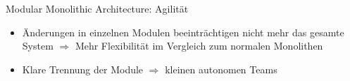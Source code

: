 \begin{frame}{Modular Monolithic Architecture: Agilität}
    \begin{itemize}
      \item Änderungen in einzelnen Modulen beeinträchtigen nicht mehr das gesamte System $\Rightarrow$ Mehr Flexibilität im Vergleich zum normalen Monolithen
        \item Klare Trennung der Module $\Rightarrow$ kleinen autonomen Teams
    \end{itemize}
\end{frame}
